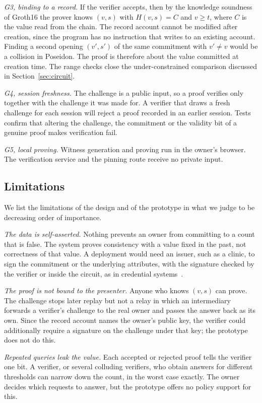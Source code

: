 \emph{G3, binding to a record.} If the verifier accepts, then by the
knowledge soundness of Groth16 the prover knows $(v, s)$ with $H(v, s) = C$
and $v \ge t$, where $C$ is the value read from the chain. The record
account cannot be modified after creation, since the program has no
instruction that writes to an existing account. Finding a second opening
$(v', s')$ of the same commitment with $v' \ne v$ would be a collision in
Poseidon. The proof is therefore about the value committed at creation time.
The range checks close the under-constrained comparison discussed in
Section~\ref{sec:circuit}.

\emph{G4, session freshness.} The challenge is a public input, so a proof
verifies only together with the challenge it was made for. A verifier that
draws a fresh challenge for each session will reject a proof recorded in an
earlier session. Tests confirm that altering the challenge, the commitment
or the validity bit of a genuine proof makes verification fail.

\emph{G5, local proving.} Witness generation and proving run in the owner's
browser. The verification service and the pinning route receive no private
input.

\subsection{Limitations}\label{sec:limits}

We list the limitations of the design and of the prototype in what we judge
to be decreasing order of importance.

\emph{The data is self-asserted.} Nothing prevents an owner from committing
to a count that is false. The system proves consistency with a value fixed
in the past, not correctness of that value. A deployment would need an
issuer, such as a clinic, to sign the commitment or the underlying
attributes, with the signature checked by the verifier or inside the
circuit, as in credential
systems~\cite{camenisch2001credentials,w3c2025vc}.

\emph{The proof is not bound to the presenter.} Anyone who knows $(v, s)$
can prove. The challenge stops later replay but not a relay in which an
intermediary forwards a verifier's challenge to the real owner and passes
the answer back as its own. Since the record account names the owner's
public key, the verifier could additionally require a signature on the
challenge under that key; the prototype does not do this.

\emph{Repeated queries leak the value.} Each accepted or rejected proof
tells the verifier one bit. A verifier, or several colluding verifiers, who
obtain answers for different thresholds can narrow down the count, in the
worst case exactly. The owner decides which requests to answer, but the
prototype offers no policy support for this.

